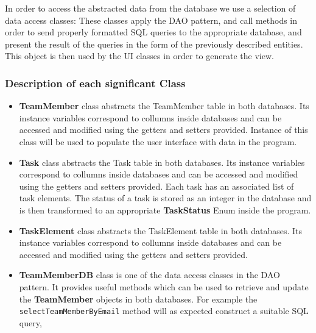   In order to access the abstracted data from the database we use a selection of data access classes:
  These classes apply the DAO pattern, and call methods in order to send properly formatted SQL queries to the appropriate database, and present the result of the queries in the form of the previously described entities. 
  This object is then used by the UI classes in order to generate the view.

  \subsubsection{Description of each significant Class}

  \begin{itemize}
  		\item \textbf{TeamMember} class abstracts the TeamMember table in both databases. Its instance variables correspond to collumns inside 
  		databases and can be accessed and modified using the getters and setters provided. Instance of this class will be used to populate
  		the user interface with data in the program.
  		\item \textbf{Task} class abstracts the Task table in both databases. Its instance variables correspond to collumns inside 
  		databases and can be accessed and modified using the getters and setters provided. Each task has an associated list of task elements. The status of a task is stored as an integer in the database and is then transformed to an appropriate \textbf{TaskStatus} Enum inside the program.
  		\item \textbf{TaskElement} class abstracts the TaskElement table in both databases. Its instance variables correspond to collumns inside 
  		databases and can be accessed and modified using the getters and setters provided. 
  		\item \textbf{TeamMemberDB} class is one of the data access classes in the DAO pattern. It provides useful methods which can be used to retrieve and update the \textbf{TeamMember} objects in both databases. For example the \texttt{selectTeamMemberByEmail} method will as expected construct a suitable SQL query,  

  \end{itemize}
  
  

  
